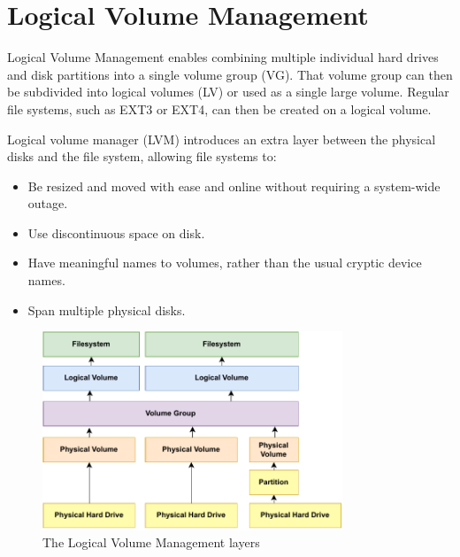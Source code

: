 \section{Logical Volume Management}
\label{section:background-lvm}

Logical Volume Management enables combining multiple individual hard drives and
disk partitions into a single volume group (VG). That volume group can then be
subdivided into logical volumes (LV) or used as a single large volume. Regular
file systems, such as EXT3 or EXT4, can then be created on a logical volume.


Logical volume manager (LVM) introduces an extra layer between the physical
disks and the file system, allowing file systems to:
\begin{itemize}
      \tightlist
      \item
            Be resized and moved with ease and online without requiring a
            system-wide outage.
      \item
            Use discontinuous space on disk.
      \item
            Have meaningful names to volumes, rather than the usual cryptic
            device names.
      \item
            Span multiple physical disks.
\end{itemize}

\begin{figure}[ht]
      \centering
      \includegraphics[width=0.8\textwidth]{resources/lvm.pdf}
      \caption{The Logical Volume Management layers}
\end{figure}

